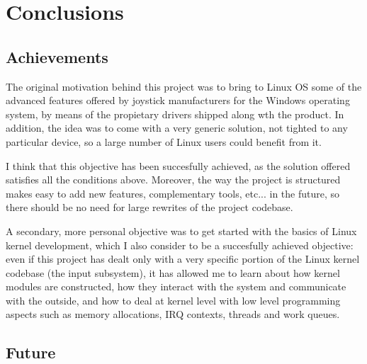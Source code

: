 \chapter{Conclusions}\label{chap:conclusions}

\section{Achievements}
The original motivation behind this project was to bring to Linux OS some of the advanced features offered by joystick manufacturers for the Windows operating system, by means of the propietary drivers shipped along wth the product. In addition, the idea was to come with a very generic solution, not tighted to any particular device, so a large number of Linux users could benefit from it.

I think that this objective has been succesfully achieved, as the solution offered satisfies all the conditions above. Moreover, the way the project is structured makes easy to add new features, complementary tools, etc... in the future, so there should be no need for large rewrites of the project codebase.

A secondary, more personal objective was to get started with the basics of Linux kernel development, which I also consider to be a succesfully achieved objective: even if this project has dealt only with a very specific portion of the Linux kernel codebase (the input subsystem), it has allowed me to learn about how kernel modules are constructed, how they interact with the system and communicate with the outside, and how to deal at kernel level with low level programming aspects such as memory allocations, IRQ contexts, threads and work queues.


\section{Future}

